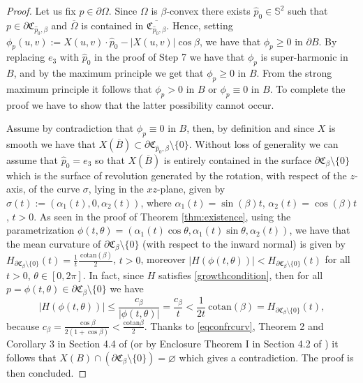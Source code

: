 \documentclass[a4paper,reqno,10pt,oneside]{amsart}
\numberwithin{equation}{section}
\begin{document}
\begin{proof}
Let us fix $p \in \partial \Omega$. Since $\Omega$ is $\beta$-convex there exists $\hat p_0\in \mathbb{S}^2$ such that   $p \in \partial\mathfrak{C}_{\hat p_0, \beta}$ and $\overline\Omega$ is contained in $\overline{\mathfrak{C}_{\hat p_0, \beta}}$. Hence, setting $\phi_{p}(u,v):=X(u,v) \cdot \hat p_0 - |X(u,v)|\cos \beta$, we have that $\phi_{p}\geq 0$ in $\partial B$. By replacing $e_3$ with $\hat p_0$ in the proof of Step 7 we have that $\phi_p$ is super-harmonic in $B$, and by the maximum principle we get that $\phi_{p}\geq 0$ in $B$. From the strong maximum principle it follows that $\phi_{p}>0$ in $B$ or $\phi_{p}\equiv 0$ in $B$. To complete the proof we have to show that the latter possibility cannot occur.

Assume by contradiction that $\phi_{p}\equiv 0$ in $B$, then, by definition and since $X$ is smooth we have that $X(\overline{B}) \subset \partial\mathfrak{C}_{\hat p_0, \beta}\setminus\{0\}$. Without loss of generality we can assume that $\hat p_0=e_3$ so that $X(\overline{B})$ is entirely contained in the surface $\partial\mathfrak{C}_{\beta}\setminus\{0\}$ which is the surface of revolution generated by the rotation, with respect of the $z$-axis, of the curve $\sigma$, lying in the $xz$-plane, given by $\sigma(t):=(\alpha_1(t),0,\alpha_2(t))$, where $\alpha_1(t)=\sin (\beta) t$, $\alpha_2(t)=\cos (\beta) t$, $t>0$. 
As seen in the proof of Theorem \ref{thm:existence}, using the parametrization $\phi(t,\theta)=(\alpha_1(t)\cos \theta, \alpha_1(t) \sin \theta, \alpha_2(t))$, we have that the mean curvature of $\partial\mathfrak{C}_{\beta}\setminus\{0\}$ (with respect to the inward normal) is given by $H_{\partial\mathfrak{C}_{\beta}\setminus\{0\}}(t)=\frac{1}{t} \frac{\ \mathrm{cotan}(\beta)}{2}$, $t>0$, moreover $|H(\phi(t,\theta))| < H_{\partial\mathfrak{C}_{ \beta}\setminus\{0\}}(t)$ for all $t>0$, $\theta \in [0,2\pi]$. In fact, since $H$ satisfies \eqref{growthcondition}, then for all $p=\phi(t,\theta) \in  \partial\mathfrak{C}_{\beta}\setminus\{0\}$ we have 
\begin{equation}\label{eqconfrcurv}
|H(\phi(t,\theta))|\leq \frac{c_\beta}{|\phi(t,\theta)|} = \frac{c_\beta}{t}< \frac{1}{2t} \ \mathrm{cotan}(\beta)=H_{\partial\mathfrak{C}_{\beta}\setminus\{0\}}(t),
\end{equation}
because $c_\beta=\frac{\cos \beta}{2(1+\cos \beta)} < \frac{\mathrm{cotan} \beta}{2}$. Thanks to \eqref{eqconfrcurv}, Theorem 2 and Corollary 3 in Section 4.4 of \cite{RegMinSurf} (or by Enclosure Theorem I in Section 4.2 of \cite{RegMinSurf}) it follows that $X(B)\cap (\partial\mathfrak{C}_{\beta}\setminus\{0\}) = \varnothing$ which gives a contradiction. 
 The proof is then concluded.
\end{proof}
\end{document}

